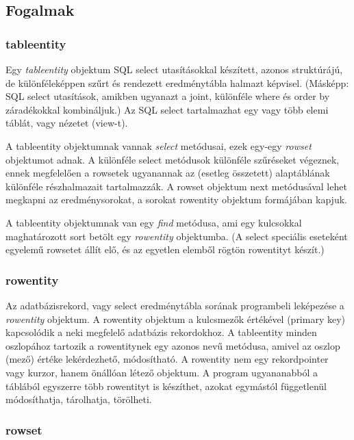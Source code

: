 
\subsection{Fogalmak}

\subsubsection*{tableentity}

Egy {\em tableentity\/} objektum SQL select utasításokkal készített,
azonos struktúrájú, de különféleképpen szűrt és rendezett eredménytábla
halmazt képvisel. (Másképp: SQL select utasítások, amikben ugyanazt a joint,
különféle where és order by záradékokkal kombináljuk.)
Az SQL select tartalmazhat egy vagy több elemi táblát, vagy nézetet (view-t).

A tableentity objektumnak vannak {\em select\/} metódusai, 
ezek egy-egy {\em rowset\/} objektumot adnak. A különféle
select metódusok különféle szűréseket végeznek, ennek megfelelően
a rowsetek ugyanannak az (esetleg összetett) alaptáblának különféle 
részhalmazait tartalmazzák. A rowset objektum next metódusával lehet 
megkapni az eredménysorokat, a sorokat rowentity objektum formájában kapjuk.

A tableentity objektumnak van egy {\em find\/} metódusa, ami egy 
kulcsokkal maghatározott sort betölt egy {\em rowentity\/} objektumba. 
(A select speciális eseteként egyelemű rowsetet állít elő, 
és az egyetlen elemből rögtön rowentityt készít.)


\subsubsection*{rowentity}

Az adatbázisrekord, vagy select eredménytábla sorának 
programbeli leképezése a {\em rowentity\/} objektum. 
A rowentity objektum a kulcsmezők értékével (primary key) kapcsolódik
a neki megfelelő adatbázis rekordokhoz.
A tableentity minden oszlopához tartozik
a rowentitynek egy azonos nevű metódusa, amivel az oszlop
(mező) értéke lekérdezhető, módosítható. 
A rowentity nem egy rekordpointer vagy kurzor, hanem önállóan 
létező objektum. A program ugyananabból a táblából
egyszerre több rowentityt is készíthet, azokat egymástól
függetlenül módosíthatja, tárolhatja, törölheti.


\subsubsection*{rowset}


